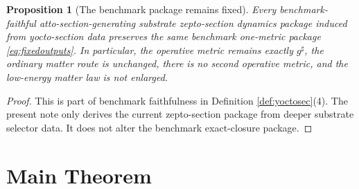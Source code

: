 \documentclass[11pt]{article}
\newcommand{\CompletedMetric}{g^{\sharp}}
\newtheorem{proposition}{Proposition}
\begin{document}
\begin{proposition}[The benchmark package remains fixed]
\label{prop:benchmark}
Every benchmark-faithful atto-section-generating substrate zepto-section dynamics package induced from yocto-section data preserves the same benchmark one-metric package \eqref{eq:fixedoutputs}. In particular, the operative metric remains exactly \(\CompletedMetric\), the ordinary matter route is unchanged, there is no second operative metric, and the low-energy matter law is not enlarged.
\end{proposition}

\begin{proof}
This is part of benchmark faithfulness in Definition \ref{def:yoctosec}(4). The present note only derives the current zepto-section package from deeper substrate selector data. It does not alter the benchmark exact-closure package.
\end{proof}

\section{Main Theorem}
\end{document}

